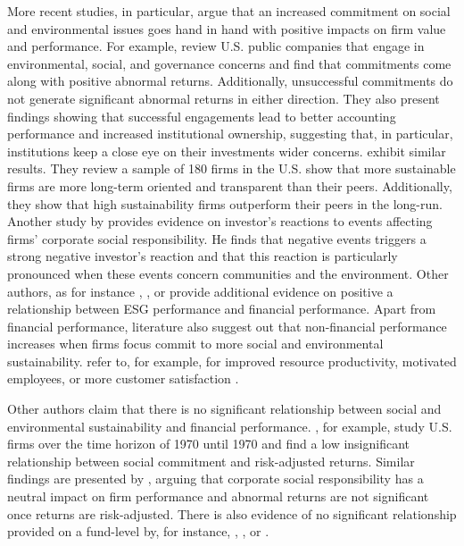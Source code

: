\documentclass[11pt]{article}
\begin{document}
More recent studies, in particular, argue that an increased commitment on social and environmental issues goes hand in hand with positive impacts on firm value and performance. For example, \citet{Dimson2015} review U.S. public companies that engage in environmental, social, and governance concerns and find that commitments come along with positive abnormal returns. Additionally, unsuccessful commitments do not generate significant abnormal returns in either direction. They also present findings showing that successful engagements lead to better accounting performance and increased institutional ownership, suggesting that, in particular, institutions keep a close eye on their investments wider concerns. \citet{Eccles2014} exhibit similar results. They review a sample of 180 firms in the U.S. show that more sustainable firms are more long-term oriented and transparent than their peers. Additionally, they show that high sustainability firms outperform their peers in the long-run. Another study by \citet{Kruger2015} provides evidence on investor’s reactions to events affecting firms’ corporate social responsibility. He finds that negative events triggers a strong negative investor’s reaction and that this reaction is particularly pronounced when these events concern communities and the environment. Other authors, as for instance \citet{Ge2015}, \citet{Fatemi2015}, or \citet{Porter2006} provide additional evidence on positive a relationship between ESG performance and financial performance. Apart from financial performance, literature also suggest out that non-financial performance increases when firms focus commit to more social and environmental sustainability. \citet{Porter1995, Greening2000, Xie2014} refer to, for example, for improved resource productivity, motivated employees, or more customer satisfaction \citep[as cited in][]{Fatemi2018}.
 


Other authors claim that there is no significant relationship between social and environmental sustainability and financial performance. \citet{Alexander1978}, for example, study U.S. firms over the time horizon of 1970 until 1970 and find a low insignificant relationship between social commitment and risk-adjusted returns. Similar findings are presented by \citet{Siegel2000}, arguing that corporate social responsibility has a neutral impact on firm performance and abnormal returns are not significant once returns are risk-adjusted. There is also evidence of no significant relationship provided on a fund-level by, for instance, \citet{Renneboog2008}, \citet{Bauer2005}, or \citet{Hamilton1993}. 
\end{document}
